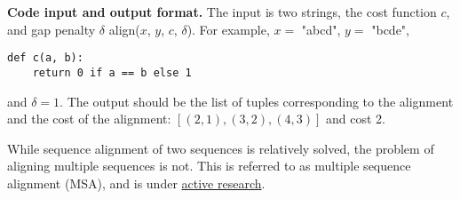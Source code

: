 \documentclass{hw}
\newcommand{\io}{\textbf{Code input and output format.} }
\begin{document}
\begin{challenge}
\io The input is two strings, the cost function $c$, and gap penalty $\delta$
align($x$, $y$, $c$, $\delta$).
For example, $x = $ "abcd", $y=$ "bcde",
\begin{verbatim}
def c(a, b):
    return 0 if a == b else 1
\end{verbatim}
and $\delta = 1$.
The output should be the list of tuples corresponding to the alignment and the cost of the alignment:
$[(2,1), (3,2), (4,3)]$ and cost 2.


While sequence alignment of two sequences is relatively solved,
the problem of aligning multiple sequences is not.
This is referred to as multiple sequence alignment (MSA),
and is under \href{https://academic.oup.com/bioinformatics/article/39/1/btac724/6820925}{active research}.

\end{challenge}
\end{document}

